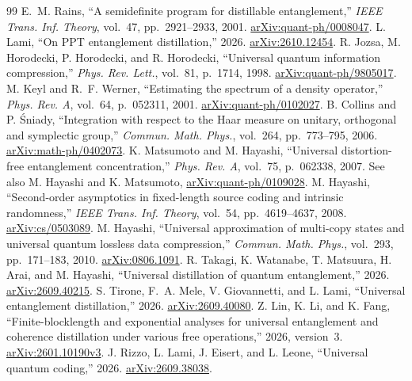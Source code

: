 \begin{thebibliography}{99}
 E.~M. Rains, ``A semidefinite program for distillable entanglement,'' \emph{IEEE Trans. Inf. Theory}, vol.~47, pp.~2921--2933, 2001. \href{https://arxiv.org/abs/quant-ph/0008047}{arXiv:quant-ph/0008047}.
 L. Lami, ``On PPT entanglement distillation,'' 2026. \href{https://arxiv.org/abs/2610.12454}{arXiv:2610.12454}.
 R. Jozsa, M. Horodecki, P. Horodecki, and R. Horodecki, ``Universal quantum information compression,'' \emph{Phys. Rev. Lett.}, vol.~81, p.~1714, 1998. \href{https://arxiv.org/abs/quant-ph/9805017}{arXiv:quant-ph/9805017}.
 M. Keyl and R.~F. Werner, ``Estimating the spectrum of a density operator,'' \emph{Phys. Rev. A}, vol.~64, p.~052311, 2001. \href{https://arxiv.org/abs/quant-ph/0102027}{arXiv:quant-ph/0102027}.
 B. Collins and P. \'{S}niady, ``Integration with respect to the Haar measure on unitary, orthogonal and symplectic group,'' \emph{Commun. Math. Phys.}, vol.~264, pp.~773--795, 2006. \href{https://arxiv.org/abs/math-ph/0402073}{arXiv:math-ph/0402073}.
 K. Matsumoto and M. Hayashi, ``Universal distortion-free entanglement concentration,'' \emph{Phys. Rev. A}, vol.~75, p.~062338, 2007. See also M. Hayashi and K. Matsumoto, \href{https://arxiv.org/abs/quant-ph/0109028}{arXiv:quant-ph/0109028}.
 M. Hayashi, ``Second-order asymptotics in fixed-length source coding and intrinsic randomness,'' \emph{IEEE Trans. Inf. Theory}, vol.~54, pp.~4619--4637, 2008. \href{https://arxiv.org/abs/cs/0503089}{arXiv:cs/0503089}.
 M. Hayashi, ``Universal approximation of multi-copy states and universal quantum lossless data compression,'' \emph{Commun. Math. Phys.}, vol.~293, pp.~171--183, 2010. \href{https://arxiv.org/abs/0806.1091}{arXiv:0806.1091}.
 R. Takagi, K. Watanabe, T. Matsuura, H. Arai, and M. Hayashi, ``Universal distillation of quantum entanglement,'' 2026. \href{https://arxiv.org/abs/2609.40215}{arXiv:2609.40215}.
 S. Tirone, F.~A. Mele, V. Giovannetti, and L. Lami, ``Universal entanglement distillation,'' 2026. \href{https://arxiv.org/abs/2609.40080}{arXiv:2609.40080}.
 Z. Lin, K. Li, and K. Fang, ``Finite-blocklength and exponential analyses for universal entanglement and coherence distillation under various free operations,'' 2026, version~3. \href{https://arxiv.org/abs/2601.10190v3}{arXiv:2601.10190v3}.
 J. Rizzo, L. Lami, J. Eisert, and L. Leone, ``Universal quantum coding,'' 2026. \href{https://arxiv.org/abs/2609.38038}{arXiv:2609.38038}.

\end{thebibliography}
